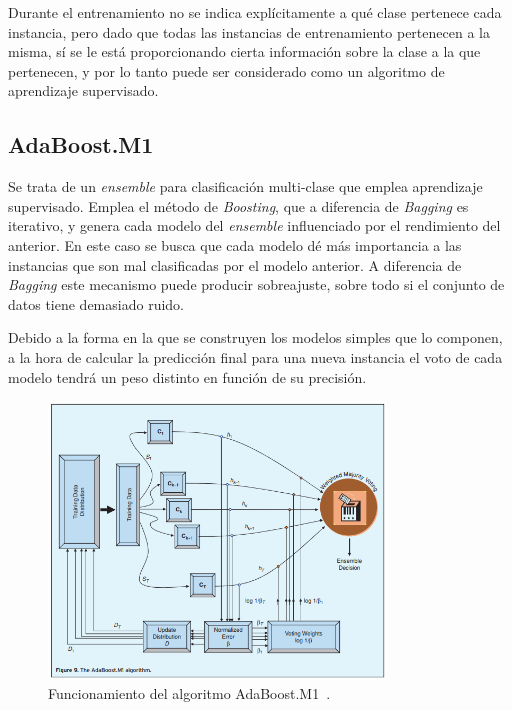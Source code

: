 Durante el entrenamiento no se indica explícitamente a qué clase pertenece cada instancia, pero dado que todas las instancias de entrenamiento pertenecen a la misma, sí se le está proporcionando cierta información sobre la clase a la que pertenecen, y por lo tanto puede ser considerado como un algoritmo de aprendizaje supervisado. 

\subsection{AdaBoost.M1}

Se trata de un \textit{ensemble} para clasificación multi-clase que emplea aprendizaje supervisado. Emplea el método de \textit{Boosting}, que a diferencia de \textit{Bagging} es iterativo, y genera cada modelo del \textit{ensemble} influenciado por el rendimiento del anterior. En este caso se busca que cada modelo dé más importancia a las instancias que son mal clasificadas por el modelo anterior. A diferencia de \textit{Bagging} este mecanismo puede producir sobreajuste, sobre todo si el conjunto de datos tiene demasiado ruido. 

Debido a la forma en la que se construyen los modelos simples que lo componen, a la hora de calcular la predicción final para una nueva instancia el voto de cada modelo tendrá un peso distinto en función de su precisión.  

\begin{figure}[H]
	\centering
	\includegraphics[width=0.8\textwidth]{../img/adaboostm1.png}
	\caption{Funcionamiento del algoritmo AdaBoost.M1~\cite{polikar2006ensemble}.}
	\label{fig:adaboostm1}
\end{figure}

